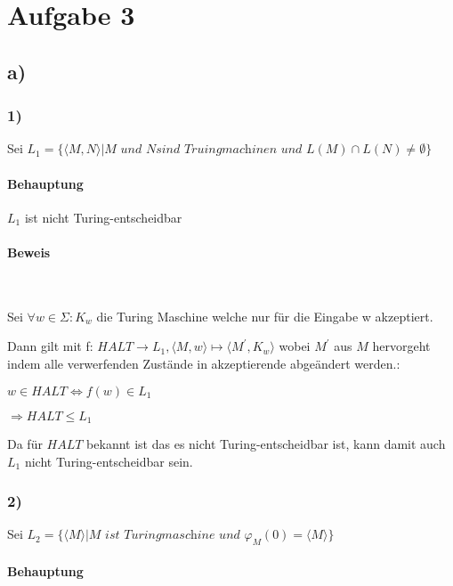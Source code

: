 \section*{Aufgabe 3}

\subsection*{a)}

\subsubsection*{1)}

Sei $L_1 = \{\langle M,N \rangle | M \textit{ und } N \textit{sind Truingmachinen und } L(M) \cap L(N) \neq \emptyset\}$

\paragraph*{Behauptung}

$L_1$ ist nicht Turing-entscheidbar

\paragraph*{Beweis}~

Sei $\forall w \in \Sigma: K_w$ die Turing Maschine welche nur für die Eingabe w akzeptiert.

Dann gilt mit f: $HALT  \to L_1,  \langle M, w \rangle \mapsto \langle M^\prime, K_w \rangle$ wobei $M^\prime$ aus $M$ hervorgeht indem alle verwerfenden Zustände in akzeptierende abgeändert werden.:

$w \in HALT \Leftrightarrow f(w) \in L_1$

$\Rightarrow HALT \leq L_1$

Da für $HALT$ bekannt ist das es nicht Turing-entscheidbar ist, kann damit auch $L_1$ nicht Turing-entscheidbar sein.

\subsubsection*{2)}

Sei $L_2 = \{ \langle M \rangle | M \textit{ ist Turingmaschine und }\varphi_M(0) = \langle M \rangle \}$

\paragraph*{Behauptung}

